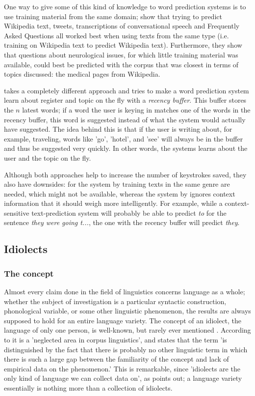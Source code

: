 \documentclass[12pt]{article}
\begin{document}
One way to give some of this kind of knowledge to word prediction systems is to use training material from the same domain;  show that trying to predict Wikipedia text, tweets, transcriptions of conversational speech and Frequently Asked Questions all worked best when using texts from the same type (i.e. training on Wikipedia text to predict Wikipedia text). Furthermore, they show that questions about neurological issues, for which little training material was available, could best be predicted with the corpus that was closest in terms of topics discussed: the medical pages from Wikipedia. 

 takes a completely different approach and tries to make a word prediction system learn about register and topic on the fly with a \emph{recency buffer}. This buffer stores the $n$ latest words; if a word the user is keying in matches one of the words in the recency buffer, this word is suggested instead of what the system would actually have suggested. The idea behind this is that if the user is writing about, for example, traveling, words like 'go', 'hotel', and 'see'  will always be in the buffer and thus be suggested very quickly. In other words, the systems learns about the user and the topic on the fly.

Although both approaches help to increase the number of keystrokes saved, they also have downsides: for the system by  training texts in the same genre are needed, which might not be available, whereas the system by  ignores context information that it should weigh more intelligently. For example, while a context-sensitive text-prediction system will probably be able to predict \emph{to} for the sentence \emph{they were going t...}, the one with the recency buffer will predict \emph{they}.


\subsection{Idiolects} \label{idiolects}

\subsubsection{The concept}
Almost every claim done in the field of linguistics concerns language as a whole; whether the subject of investigation is a particular syntactic construction, phonological variable, or some other linguistic phenomenon, the results are always supposed to hold for an entire language variety. The concept of an idiolect, the language of only one person, is well-known, but rarely ever mentioned \cite{mollin09, barlow10, louwerse04}. According to  it is a 'neglected area in corpus linguistics', and  states that the term 'is distinguished by the fact that there is probably no other linguistic term in which there is such a large gap between the familiarity of the concept and lack of empirical data on the phenomenon.' This is remarkable, since 'idiolects are the only kind of language we can collect data on', as  points out; a language variety essentially is nothing more than a collection of idiolects.
\end{document}
